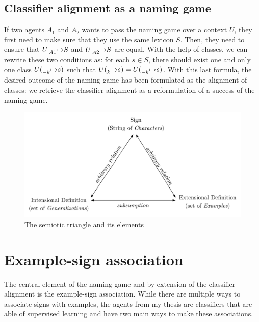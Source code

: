 \subsection{Classifier alignment as a naming game}
If two agents $A_{1}$ and $A_{2}$ wants to pass the naming game over a context $U$, they first need to make sure that they use the same lexicon $S$. Then, they need to ensure that $U \prescript{}{A1}{\mapsto} S $ and $ U \prescript{}{A2}{\mapsto} S$ are equal. With the help of classes, we can rewrite these two conditions as: for each $s \in S$, there should exist one and only one class $U(\prescript{}{-k}{\mapsto} s)$ such that $U(\prescript{}{k}{\mapsto} s) = U(\prescript{}{-k}{\mapsto} s)$. With this last formula, the desired outcome of the naming game has been formulated as the alignment of classes: we retrieve the classifier alignment as a reformulation of a success of the naming game.

\begin{figure}[t]
    \centering
    \includegraphics[width = \textwidth]{figs/4.pdf}
    \caption{The semiotic triangle and its elements}
    \label{fig:semTriangle}
\end{figure}

\section{Example-sign association}
The central element of the naming game and by extension of the classifier alignment is the example-sign association. While there are multiple ways to associate signs with examples, the agents from my thesis are classifiers that are able of supervised learning and have two main ways to make these associations.

